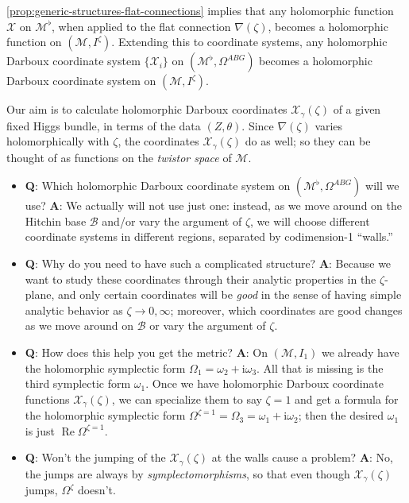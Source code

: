 \documentclass[12pt,letterpaper,reqno]{article}
\numberwithin{equation}{section}
\newcommand{\cB}{\ensuremath{\mathcal B}}
\newcommand{\cM}{\ensuremath{\mathcal M}}
\newcommand{\cX}{\ensuremath{\mathcal X}}
\newcommand{\I}{{\mathrm i}}
\newcommand{\ti}[1]{\textit{#1}}
\DeclareMathOperator{\re}{Re}
\newcommand{\insfig}[2]{

\medskip
\noindent
\begin{minipage}{\linewidth}

\makebox[\linewidth]{\texttt{[image: figures/\#1-crop.pdf]}}

\end{minipage}
\medskip

}
\begin{document}
\autoref{prop:generic-structures-flat-connections} 
implies that any holomorphic function $\cX$ on $\cM^\flat$,
when applied to
the flat connection $\nabla(\zeta)$, becomes a holomorphic
function on $(\cM, I^\zeta)$.
Extending this to coordinate systems, any holomorphic 
Darboux coordinate system $\{\cX_i\}$ on $(\cM^\flat, \Omega^{ABG})$
becomes a holomorphic Darboux coordinate system on
$(\cM, I^\zeta)$.

Our aim is to calculate holomorphic Darboux
coordinates $\cX_\gamma(\zeta)$ of a given fixed Higgs bundle,
in terms of the data $(Z, \theta)$.
Since $\nabla(\zeta)$ varies
holomorphically with $\zeta$, the coordinates
$\cX_\gamma(\zeta)$ do as well; so they can be thought of
as functions on the \ti{twistor space} of $\cM$.

\begin{itemize}
\item {\bf Q}: Which holomorphic Darboux coordinate system on
$(\cM^\flat, \Omega^{ABG})$ will we use? 
{\bf A}: We actually
will not use just one: instead, as we move around on the
Hitchin base $\cB$ and/or vary the argument of $\zeta$, 
we will choose different coordinate
systems in different regions, separated by codimension-1 ``walls.''

\insfig{higgs-metric-6}{0.8}

\item {\bf Q}: Why do you need to have such a complicated structure? {\bf A}: Because we want to study
these coordinates through their analytic properties in the
$\zeta$-plane, and only certain coordinates will be \ti{good} in the sense of having 
simple analytic behavior
as $\zeta \to 0, \infty$; moreover, which coordinates are good changes as
we move around on $\cB$ or vary the argument of $\zeta$.


\item {\bf Q}: How does this help you get the metric? {\bf A}: On $(\cM, I_1)$ we 
already have the holomorphic
symplectic form $\Omega_1 = \omega_2 + \I \omega_3$. All that
is missing is the third symplectic form $\omega_1$.
Once we have holomorphic Darboux coordinate functions $\cX_\gamma(\zeta)$,
we can specialize them to say $\zeta = 1$ and get a formula
for the holomorphic symplectic form $\Omega^{\zeta = 1} = \Omega_3 = \omega_1 + \I \omega_2$; then the desired $\omega_1$ is just
$\re \Omega^{\zeta = 1}$.

\item {\bf Q}: Won't the jumping of the $\cX_\gamma(\zeta)$ at the walls
cause a problem? {\bf A}: No, the jumps are always by \ti{symplectomorphisms},
so that even though $\cX_\gamma(\zeta)$ jumps, $\Omega^\zeta$ doesn't.
\end{itemize}
\end{document}

